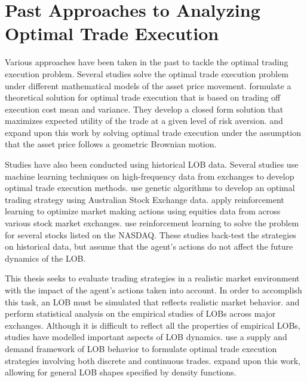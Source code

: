 \section{Past Approaches to Analyzing Optimal Trade Execution}
Various approaches have been taken in the past to tackle the optimal trading execution problem. Several studies solve the optimal trade execution problem under different mathematical models of the asset price movement. \cite{A1} formulate a theoretical solution for optimal trade execution that is based on trading off execution cost mean and variance. They develop a closed form solution that maximizes expected utility of the trade at a given level of risk aversion. \cite{A1a} and \cite{A1b} expand upon this work by solving optimal trade execution under the assumption that the asset price follows a geometric Brownian motion. 

Studies have also been conducted using historical LOB data. Several studies use machine learning techniques on high-frequency data from exchanges to develop optimal trade execution methods. \cite{A5} use genetic algorithms to develop an optimal trading strategy using Australian Stock Exchange data. \cite{A4} apply reinforcement learning to optimize market making actions using equities data from across various stock market exchanges. \cite{A3} use reinforcement learning to solve the problem for several stocks listed on the NASDAQ. These studies back-test the strategies on historical data, but assume that the agent's actions do not affect the future dynamics of the LOB.

This thesis seeks to evaluate trading strategies in a realistic market environment with the impact of the agent’s actions taken into account. In order to accomplish this task, an LOB must be simulated that reflects realistic market behavior. \cite{A10a} and \cite{A10b} perform statistical analysis on the empirical studies of LOBs across major exchanges. Although it is difficult to reflect all the properties of empirical LOBs, studies have modelled important aspects of LOB dynamics. \cite{A11} use a supply and demand framework of LOB behavior to formulate optimal trade execution strategies involving both discrete and continuous trades. \cite{A2} expand upon this work, allowing for general LOB shapes specified by density functions.

